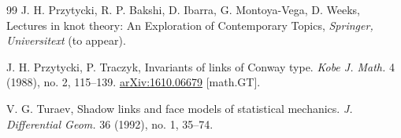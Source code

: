 \documentclass[12pt]{amsproc}
\begin{document}
\begin{thebibliography}{99}
J. H. Przytycki, R. P. Bakshi, D. Ibarra, G. Montoya-Vega, D. Weeks, Lectures in knot theory: An Exploration of Contemporary Topics, {\it Springer, Universitext} (to appear).

J. H. Przytycki, P. Traczyk,
Invariants of links of Conway type. 
{\it Kobe J. Math.} 4 (1988), no. 2, 115–139. \href{https://arxiv.org/abs/1610.06679}{arXiv:1610.06679} [math.GT].

V. G. Turaev, Shadow links and face models of statistical mechanics. 
{\it J. Differential Geom.} 36 (1992), no. 1, 35–74. 
    
    \end{thebibliography}
\end{document}
